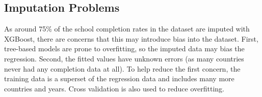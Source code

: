 \documentclass[11pt]{article}
\begin{document}
\subsection{Imputation Problems}
As around 75\% of the school completion rates in the dataset are imputed with XGBoost, there are concerns that this may introduce bias into the dataset. First, tree-based models are prone to overfitting, so the imputed data may bias the regression. Second, the fitted values have unknown errors (as many countries never had any completion data at all). To help reduce the first concern, the training data is a superset of the regression data and includes many more countries and years. Cross validation is also used to reduce overfitting.
\pagebreak
\nocite{*}
\printbibliography
\end{document}
